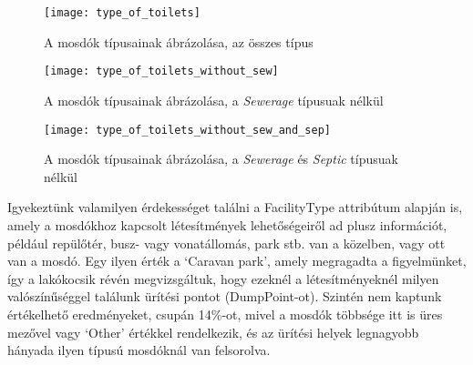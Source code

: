 	\begin{figure}[!ht]
		\centering	
			\texttt{[image: type\_of\_toilets]}
			\caption{A mosdók típusainak ábrázolása, az összes típus}
	\end{figure}
	\begin{figure}[!ht]
		\centering	
			\texttt{[image: type\_of\_toilets\_without\_sew]}
			\caption{A mosdók típusainak ábrázolása, a \textit{Sewerage} típusuak nélkül}
	\end{figure}
	\begin{figure}[!ht]
		\centering	
			\texttt{[image: type\_of\_toilets\_without\_sew\_and\_sep]}
			\caption{A mosdók típusainak ábrázolása, a \textit{Sewerage} és \textit{Septic} típusuak nélkül}
			\label{fig:without_two_biggest}
	\end{figure}
	Igyekeztünk valamilyen érdekességet találni a FacilityType attribútum alapján is, amely a mosdókhoz kapcsolt létesítmények lehetőségeiről ad plusz információt, például repülőtér, busz- vagy vonatállomás, park stb. van a közelben, vagy ott van a mosdó. Egy ilyen érték a ‘Caravan park’, amely megragadta a figyelmünket, így a lakókocsik révén megvizsgáltuk, hogy ezeknél a létesítményeknél milyen valószínűséggel találunk ürítési pontot (DumpPoint-ot). Szintén nem kaptunk értékelhető eredményeket, csupán 14\%-ot, mivel a mosdók többsége itt is üres mezővel vagy ‘Other’ értékkel rendelkezik, és az ürítési helyek legnagyobb hányada ilyen típusú mosdóknál van felsorolva.

	
	